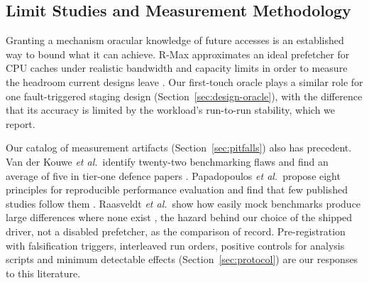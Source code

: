\subsection{Limit Studies and Measurement Methodology}

Granting a mechanism oracular knowledge of future accesses is an established
way to bound what it can achieve. R-Max approximates an ideal prefetcher for
CPU caches under realistic bandwidth and capacity limits in order to measure
the headroom current designs leave \cite{wang2025rmax}. Our first-touch oracle
plays a similar role for one fault-triggered staging design (Section~\ref{sec:design-oracle}),
with the difference that its accuracy is limited by the workload's run-to-run
stability, which we report.

Our catalog of measurement artifacts (Section~\ref{sec:pitfalls}) also has
precedent. Van der Kouwe \emph{et al.}\ identify twenty-two benchmarking flaws
and find an average of five in tier-one defence papers
\cite{vanderkouwe2019sok}. Papadopoulos \emph{et al.}\ propose eight principles
for reproducible performance evaluation and find that few published studies
follow them \cite{papadopoulos2019principles}. Raasveldt \emph{et al.}\ show how
easily mock benchmarks produce large differences where none exist
\cite{raasveldt2018fair}, the hazard behind our choice of the shipped driver,
not a disabled prefetcher, as the comparison of record. Pre-registration with
falsification triggers, interleaved run orders, positive controls for analysis
scripts and minimum detectable effects (Section~\ref{sec:protocol}) are our
responses to this literature.

